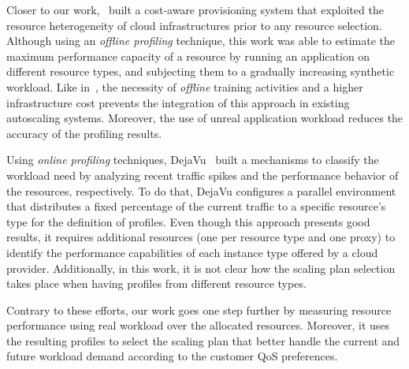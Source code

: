 Closer to our work,~\cite{sharma_cost-aware_2011} built a cost-aware provisioning system that exploited the resource heterogeneity of cloud infrastructures prior to any resource selection. Although using an \emph{offline profiling} technique, this work was able to estimate the maximum performance capacity of a resource by running an application on different resource types, and subjecting them to a gradually increasing synthetic workload. Like in~\cite{smartscale_2012}, the necessity of \emph{offline} training activities and a higher infrastructure cost prevents the integration of this approach in existing autoscaling systems. Moreover, the use of unreal application workload reduces the accuracy of the profiling results.


Using \emph{online profiling} techniques, DejaVu~\cite{dejavu2012}  built a mechanisms to classify the workload need by analyzing recent traffic spikes and the performance behavior of the resources, respectively. To do that, DejaVu configures a parallel environment that distributes a fixed percentage of the current traffic to a specific resource's type for the definition of profiles. Even though this approach presents good results, it requires additional resources (one per resource type and one proxy) to identify the performance capabilities of each instance type offered by a cloud provider. Additionally, in this work, it is not clear how the scaling plan selection takes place when having profiles from different resource types. %


Contrary to these efforts, our work goes one step further by measuring resource performance using real workload over the allocated resources. Moreover, it uses the resulting profiles to select the scaling plan that better handle the current and future workload demand according to the customer QoS preferences.

